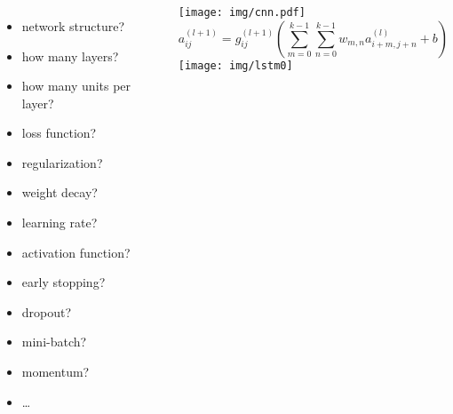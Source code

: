 \documentclass[UTF8,11pt,colorlinks,compress,openany]{beamer}%
\begin{document}
\begin{frame}\frametitle{}
	\begin{columns}
			\begin{itemize}
				\item network structure?
				\item how many layers?
				\item how many units per layer?
				\item loss function?
				\item regularization?
				\item weight decay?
				\item learning rate?
				\item activation function?
				\item early stopping?
				\item dropout?
				\item mini-batch?
				\item momentum?
				\item \dots
			\end{itemize}
			\centering\texttt{[image: img/cnn.pdf]}
			\[a_{ij}^{(l+1)}=g_{ij}^{(l+1)}\left(\sum_{m=0}^{k-1} \sum_{n=0}^{k-1} w_{m,n} a_{i+m,j+n}^{(l)}+b\right)\]
			\centering\texttt{[image: img/lstm0]}
	\end{columns}
\end{frame}
\end{document}
